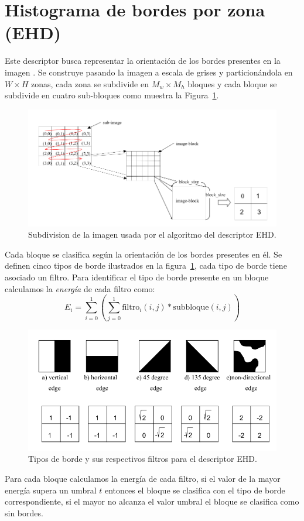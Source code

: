\section{Histograma de bordes por zona (EHD)}\label{ehd}
Este descriptor busca representar la orientación de los bordes presentes en la imagen \cite{Manjunath:ehd}. Se construye pasando la imagen a escala de grises y particionándola en $W \times H$ zonas, cada zona se subdivide en $M_w \times M_h$ bloques y cada bloque se subdivide en cuatro sub-bloques como muestra la Figura~\ref{ehd_blocks}. 
    \begin{figure}[!h]
		\centering
		\includegraphics[scale=0.45]{imagenes/cap3/ehd_blocks.png}
		\caption{Subdivision de la imagen usada por el algoritmo del descriptor EHD.}
		\label{ehd_blocks}
	\end{figure}
Cada bloque se clasifica según la orientación de los bordes presentes en él. Se definen cinco tipos de borde ilustrados en la figura~\ref{ehd_blocks}, cada tipo de borde tiene asociado un filtro. Para identificar el tipo de borde presente en un bloque calculamos la \emph{energía} de cada filtro como: 
\begin{equation*}
E_i =  \displaystyle\sum_{i=0}^{1} \left(\displaystyle\sum_{j=0}^{1} \text{filtro}_i(i,j) * \text{subbloque}(i,j)\right)
\end{equation*}

    \begin{figure}[!h]
		\centering
		\includegraphics[scale=0.45]{imagenes/cap3/ehd_filters.png}
		\caption{Tipos de borde y sus respectivos filtros para el descriptor EHD.}
		\label{ehd_filters}
	\end{figure}
Para cada bloque calculamos la energía de cada filtro, si el valor de la mayor energía supera un umbral $t$ entonces el bloque se clasifica con el tipo de borde correspondiente, si el mayor no alcanza el valor umbral el bloque se clasifica como sin bordes.

